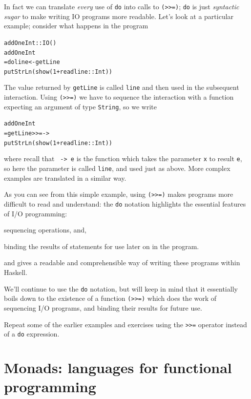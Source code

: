 In fact we can translate \emph{every} use of \texttt{do} into calls to \texttt{(>>=)}; \texttt{do} is just \emph{syntactic sugar} to make writing IO programs more readable.
Let's look at a particular example; consider what happens in the program
\begin{alltt}
addOneInt :: IO ()
addOneInt 
  = do line <- getLine
       putStrLn (show (1 + read line :: Int))       
\end{alltt}
The value returned by \texttt{getLine} is called \texttt{line} and then
used in the subsequent interaction. Using \texttt{(>>=)} we have to
sequence the interaction with a function expecting an argument of type
\texttt{String}, so we write
\begin{alltt}
addOneInt 
  = getLine >>=  ->
    putStrLn (show (1 + read line :: Int))       
\end{alltt}
where recall that \texttt{ -> e} is the function which takes the
parameter \texttt{x} to result \texttt{e}, so here the parameter is
called \texttt{line}, and used just as above. More complex examples
are translated in a similar way. 

As you can see from this simple example, using \texttt{(>>=)} makes programs more difficult to read and understand: the \texttt{do} notation highlights the essential features of I/O programming:
\begin{titemize}
\item sequencing operations, and,
\item binding the results of statements for use later on in the program.
\end{titemize}
and gives a readable and comprehensible way of writing these programs within Haskell.

We'll continue to use the
\texttt{do} notation, but will keep in mind that it essentially boils down to the existence of a
function \texttt{(>>=)} which does the work of sequencing I/O programs, and binding their results for future use.

\begin{exerciseone}
\item
Repeat some of the earlier examples and exercises using the \texttt{>>=}
operator instead of a \texttt{do} expression.
\end{exerciseone}

\section{Monads: languages for functional programming}
\label{monadFP}


